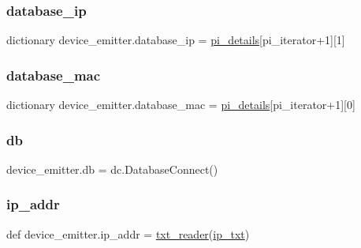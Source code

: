 \subsubsection{\texorpdfstring{database\+\_\+ip}{database\_ip}}
{\footnotesize\ttfamily dictionary device\+\_\+emitter.\+database\+\_\+ip = \mbox{\hyperlink{namespacedevice__emitter_a803e1fc15d8f8f4445053a2b36e7ac0b}{pi\+\_\+details}}\mbox{[}pi\+\_\+iterator+1\mbox{]}\mbox{[}1\mbox{]}}

\mbox{\label{namespacedevice__emitter_a74cf5779300d3c95c075f304d1340771}} 
\subsubsection{\texorpdfstring{database\+\_\+mac}{database\_mac}}
{\footnotesize\ttfamily dictionary device\+\_\+emitter.\+database\+\_\+mac = \mbox{\hyperlink{namespacedevice__emitter_a803e1fc15d8f8f4445053a2b36e7ac0b}{pi\+\_\+details}}\mbox{[}pi\+\_\+iterator+1\mbox{]}\mbox{[}0\mbox{]}}

\mbox{\label{namespacedevice__emitter_a0559bc31b21eed1581ff97fccbbd75d7}} 
\subsubsection{\texorpdfstring{db}{db}}
{\footnotesize\ttfamily device\+\_\+emitter.\+db = dc.\+Database\+Connect()}

\mbox{\label{namespacedevice__emitter_accb17d54f29bb0b5cc59b7f81d3ed0f3}} 
\subsubsection{\texorpdfstring{ip\+\_\+addr}{ip\_addr}}
{\footnotesize\ttfamily def device\+\_\+emitter.\+ip\+\_\+addr = \mbox{\hyperlink{namespacedevice__emitter_a37babfaa6ea3bbb358c94516521f9442}{txt\+\_\+reader}}(\mbox{\hyperlink{namespacedevice__emitter_adffb57ad574487e214cf5a3033abbae8}{ip\+\_\+txt}})}

